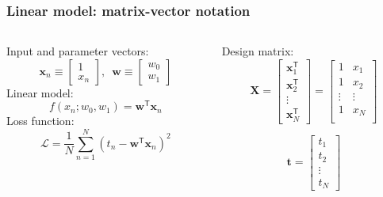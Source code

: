\documentclass[english,10pt,aspectratio=169,fleqn]{beamer}
\begin{document}
\begin{frame} %
\frametitle{Linear model: matrix-vector notation}

\begin{columns}

\begin{column}{0.5\textwidth}
Input and parameter vectors:
\begin{equation*}
\mathbf{x}_{n} \equiv \begin{bmatrix}
1 \\
x_{n}
\end{bmatrix}
,\,\,\,%
\mathbf{w} \equiv \begin{bmatrix}
w_{0} \\
w_{1}
\end{bmatrix}
\end{equation*}
%
Linear model:
\begin{equation*}
f(x_n; w_0, w_1) = \mathbf{w}^{\mathsf{T}} \mathbf{x}_{n}
\label{eq:model_linear_02}
\end{equation*}
%
Loss function:
\begin{equation}
\mathcal{L} = \frac{1}{N} \sum_{n=1}^{N} \left( t_{n} - \mathbf{w}^{\mathsf{T}}
\mathbf{x}_{n} \right)^2
\label{eq:loss_function_02}
\end{equation}
\end{column}
\begin{column}{0.5\textwidth}
Design matrix:
\begin{equation*}
\mathbf{X} = \begin{bmatrix}
\mathbf{x}^{\mathsf{T}}_{1} \\
\mathbf{x}^{\mathsf{T}}_{2} \\
\vdots \\
\mathbf{x}^{\mathsf{T}}_{N}
\end{bmatrix} =
\begin{bmatrix}
1 & x_{1} \\
1 & x_{2} \\
\vdots & \vdots \\
1 & x_{N} \\
\end{bmatrix}
\end{equation*}
  
\begin{equation*}
\mathbf{t} = \begin{bmatrix}
t_1 \\
t_2 \\
\vdots \\
t_N
\end{bmatrix}
\end{equation*}
\end{column}
\end{columns}

\end{frame}
\end{document}
